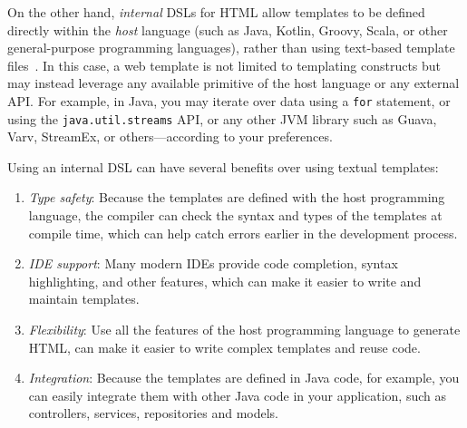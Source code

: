 On the other hand, \textit{internal} DSLs for HTML allow templates to be defined 
directly within the \emph{host} language (such as Java, Kotlin, Groovy, Scala, or 
other general-purpose programming languages), rather than using text-based 
template files~\cite{carvalho2019hot}. In this case, a web template is not limited 
to templating constructs but may instead leverage any available primitive of the 
host language or any external API.
For example, in Java, you may iterate over data using a \texttt{for} statement,
or using the \texttt{java.util.streams} API, or any other JVM library such as
Guava, Varv, StreamEx, or others—according to your preferences.

Using an internal DSL can have several benefits over using textual templates:
\begin{enumerate}
  \item \emph{Type safety}: Because the templates are defined with the host
  programming language, the compiler can check the syntax and types of the
  templates at compile time, which can help catch errors earlier in the
  development process.

  \item \emph{IDE support}: Many modern IDEs provide code completion, syntax
  highlighting, and other features, which can make it easier to write and
  maintain templates.
  
  \item \emph{Flexibility}: Use all the features of the host programming language
  to generate HTML, can make it easier to write complex templates and reuse code.
  
  \item \emph{Integration}: Because the templates are defined in Java code, for
  example, you can easily integrate them with other Java code in your
  application, such as controllers, services, repositories and models.
  
\end{enumerate}

